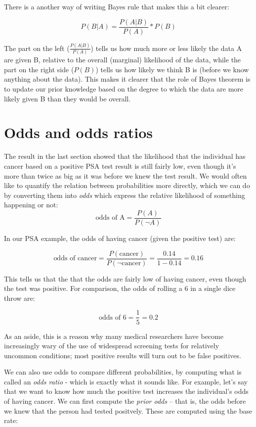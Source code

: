 \documentclass[]{book}
\theoremstyle{definition}
\theoremstyle{definition}
\theoremstyle{definition}
\theoremstyle{remark}
\begin{document}
There is a another way of writing Bayes rule that makes this a bit
clearer:

\[
P(B|A) = \frac{P(A|B)}{P(A)}*P(B)
\]

The part on the left (\(\frac{P(A|B)}{P(A)}\)) tells us how much more or
less likely the data A are given B, relative to the overall (marginal)
likelihood of the data, while the part on the right side (\(P(B)\))
tells us how likely we think B is (before we know anything about the
data). This makes it clearer that the role of Bayes theorem is to update
our prior knowledge based on the degree to which the data are more
likely given B than they would be overall.

\section{Odds and odds ratios}\label{odds-and-odds-ratios}

The result in the last section showed that the likelihood that the
individual has cancer based on a positive PSA test result is still
fairly low, even though it's more than twice as big as it was before we
knew the test result. We would often like to quantify the relation
between probabilities more directly, which we can do by converting them
into \emph{odds} which express the relative likelihood of something
happening or not:\\
\[
\text{odds of A} = \frac{P(A)}{P(\neg A)}
\]

In our PSA example, the odds of having cancer (given the positive test)
are:

\[
\text{odds of cancer} = \frac{P(\text{cancer})}{P(\neg \text{cancer})} =\frac{0.14}{1 - 0.14} = 0.16
\]

This tells us that the that the odds are fairly low of having cancer,
even though the test was positive. For comparison, the odds of rolling a
6 in a single dice throw are:

\[
\text{odds of 6} = \frac{1}{5} = 0.2
\]

As an aside, this is a reason why many medical researchers have become
increasingly wary of the use of widespread screening tests for
relatively uncommon conditions; most positive results will turn out to
be false positives.

We can also use odds to compare different probabilities, by computing
what is called an \emph{odds ratio} - which is exactly what it sounds
like. For example, let's say that we want to know how much the positive
test increases the individual's odds of having cancer. We can first
compute the \emph{prior odds} -- that is, the odds before we knew that
the person had tested positvely. These are computed using the base rate:
\end{document}
